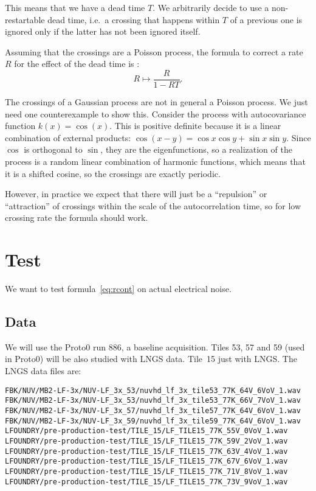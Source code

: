 This means that we have a dead time $T$. We arbitrarily decide to use a
non-restartable dead time, i.e.\ a crossing that happens within $T$ of a
previous one is ignored only if the latter has not been ignored itself.

Assuming that the crossings are a Poisson process, the formula to correct a
rate $R$ for the effect of the dead time is \cite[120]{knoll2000}:
%
\begin{equation}
    R \mapsto \frac R {1 - RT}. \label{eq:deadrate}
\end{equation}

The crossings of a Gaussian process are not in general a Poisson process. We
just need one counterexample to show this. Consider the process with
autocovariance function $k(x)=\cos(x)$. This is positive definite because it is
a linear combination of external products: $\cos(x-y) = \cos x \cos y + \sin x
\sin y$. Since $\cos$ is orthogonal to $\sin$, they are the eigenfunctions, so
a realization of the process is a random linear combination of harmonic
functions, which means that it is a shifted cosine, so the crossings are
exactly periodic.

However, in practice we expect that there will just be a ``repulsion'' or
``attraction'' of crossings within the scale of the autocorrelation time, so
for low crossing rate the formula should work.

\section{Test}

We want to test formula~\eqref{eq:rcont} on actual electrical noise.

\subsection{Data}

We will use the Proto0 run 886, a baseline acquisition. Tiles 53, 57 and 59
(used in Proto0) will be also studied with LNGS data. Tile~15 just with LNGS.
The LNGS data files are:
%
\begin{verbatim}
FBK/NUV/MB2-LF-3x/NUV-LF_3x_53/nuvhd_lf_3x_tile53_77K_64V_6VoV_1.wav
FBK/NUV/MB2-LF-3x/NUV-LF_3x_53/nuvhd_lf_3x_tile53_77K_66V_7VoV_1.wav
FBK/NUV/MB2-LF-3x/NUV-LF_3x_57/nuvhd_lf_3x_tile57_77K_64V_6VoV_1.wav
FBK/NUV/MB2-LF-3x/NUV-LF_3x_59/nuvhd_lf_3x_tile59_77K_64V_6VoV_1.wav
LFOUNDRY/pre-production-test/TILE_15/LF_TILE15_77K_55V_0VoV_1.wav
LFOUNDRY/pre-production-test/TILE_15/LF_TILE15_77K_59V_2VoV_1.wav
LFOUNDRY/pre-production-test/TILE_15/LF_TILE15_77K_63V_4VoV_1.wav
LFOUNDRY/pre-production-test/TILE_15/LF_TILE15_77K_67V_6VoV_1.wav
LFOUNDRY/pre-production-test/TILE_15/LF_TILE15_77K_71V_8VoV_1.wav
LFOUNDRY/pre-production-test/TILE_15/LF_TILE15_77K_73V_9VoV_1.wav
\end{verbatim}

